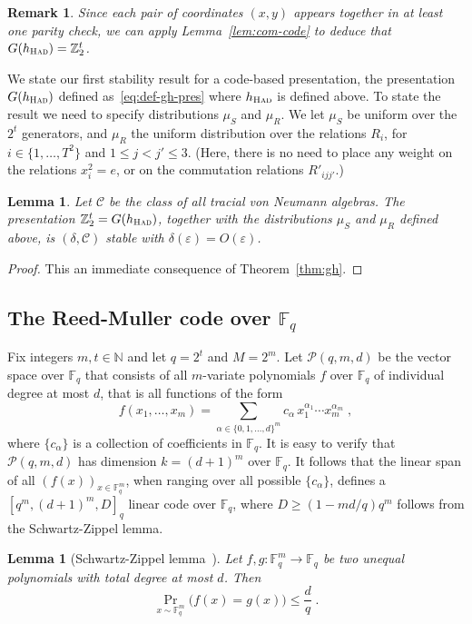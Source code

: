 \documentclass[11pt]{article}
\newtheorem{lemma}[theorem]{Lemma}
\newtheorem{remark}[theorem]{Remark}
\theoremstyle{definition}
\newcommand{\N}{\ensuremath{\mathbb{N}}}
\newcommand{\F}{\ensuremath{\mathbb{F}}}
\newcommand{\Z}{\ensuremath{\mathbb{Z}}}
\newcommand{\mC}{\ensuremath{\mathcal{C}}}
\newcommand{\mP}{\ensuremath{\mathcal{P}}}
\newcommand{\had}{\textsc{Had}}
\newcommand{\eps}{\varepsilon}
\begin{document}
\begin{remark}
Since each pair of coordinates $(x,y)$ appears together in at least one parity check, we can apply Lemma~\ref{lem:com-code} to deduce that $G(h_\had)=\Z_2^t$. 
\end{remark}

We state our first stability result for a code-based presentation, the presentation $G(h_\had)$ defined as~\eqref{eq:def-gh-pres} where $h_\had$ is defined above. To state the result we need to specify distributions $\mu_S$ and $\mu_R$. We let $\mu_S$ be uniform over the $2^t$ generators, and $\mu_R$ the uniform distribution over the relations $R_{i}$, for $i\in \{1,\ldots,T^2\}$ and $1\leq j<j'\leq 3$. (Here, there is no need to place any weight on the relations $x_i^2=e$, or on the commutation relations $R'_{ijj'}$.)  

\begin{lemma}\label{lem:had-stab}
Let $\mC$ be the class of all tracial von Neumann algebras. 
The presentation $\Z_2^t= G(h_\had)$, together with the distributions $\mu_S$ and $\mu_R$ defined above, is $(\delta,\mC)$ stable with $\delta(\eps)=O(\eps)$. 
\end{lemma}

\begin{proof}
This an immediate consequence of Theorem~\ref{thm:gh}.
\end{proof}



\subsection{The Reed-Muller code over $\F_q$}
\label{sec:rmq}

Fix integers $m,t \in \N$ and let $q=2^t$ and $M = 2^m$. Let $\mP(q,m,d)$ be the vector space over $\F_q$ that consists of all $m$-variate polynomials $f$ over $\F_q$ of individual degree at most $d$, that is all functions of the form
\[
	f(x_1,\ldots,x_m) = \sum_{\alpha \in \{0,1,\ldots,d\}^m} c_\alpha\,
  x_1^{\alpha_1} \cdots x_m^{\alpha_m}\;,
\]
where $\{c_\alpha\}$ is a collection of coefficients in $\F_q$. It is easy to verify that $\mP(q,m,d)$ has dimension $k = (d+1)^m$ over $\F_q$. It follows that the linear span of all $(f(x))_{x\in \F_q^m}$, when ranging over all possible $\{c_\alpha\}$, defines a $[q^m,(d+1)^m,D]_q$ linear code over $\F_q$, where $D\geq (1-md/q)q^m$ follows from the Schwartz-Zippel lemma.

\begin{lemma}[Schwartz-Zippel lemma~\cite{Sch80,Zip79}]
  \label{lem:schwartz-zippel}
  Let $f, g: \F_q^m \to \F_q$ be two unequal polynomials with total degree at most $d$. Then
  \begin{equation*}
    \Pr_{x \sim \F_q^m}\big(f(x) = g(x)\big) \leq \frac{d}{q}\;.
  \end{equation*}
\end{lemma}
\end{document}
